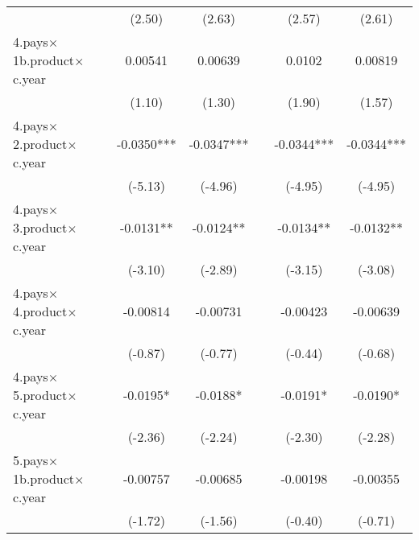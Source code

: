 {\begin{tabular}{l*{6}{c}}
                    &                     &      (2.50)         &      (2.63)         &                     &      (2.57)         &      (2.61)         \\
[1em]
4.pays$\times$1b.product$\times$c.year&                     &     0.00541         &     0.00639         &                     &      0.0102         &     0.00819         \\
                    &                     &      (1.10)         &      (1.30)         &                     &      (1.90)         &      (1.57)         \\
[1em]
4.pays$\times$2.product$\times$c.year&                     &     -0.0350***&     -0.0347***&                     &     -0.0344***&     -0.0344***\\
                    &                     &     (-5.13)         &     (-4.96)         &                     &     (-4.95)         &     (-4.95)         \\
[1em]
4.pays$\times$3.product$\times$c.year&                     &     -0.0131** &     -0.0124** &                     &     -0.0134** &     -0.0132** \\
                    &                     &     (-3.10)         &     (-2.89)         &                     &     (-3.15)         &     (-3.08)         \\
[1em]
4.pays$\times$4.product$\times$c.year&                     &    -0.00814         &    -0.00731         &                     &    -0.00423         &    -0.00639         \\
                    &                     &     (-0.87)         &     (-0.77)         &                     &     (-0.44)         &     (-0.68)         \\
[1em]
4.pays$\times$5.product$\times$c.year&                     &     -0.0195*  &     -0.0188*  &                     &     -0.0191*  &     -0.0190*  \\
                    &                     &     (-2.36)         &     (-2.24)         &                     &     (-2.30)         &     (-2.28)         \\
[1em]
5.pays$\times$1b.product$\times$c.year&                     &    -0.00757         &    -0.00685         &                     &    -0.00198         &    -0.00355         \\
                    &                     &     (-1.72)         &     (-1.56)         &                     &     (-0.40)         &     (-0.71)         \\

\end{tabular}}
